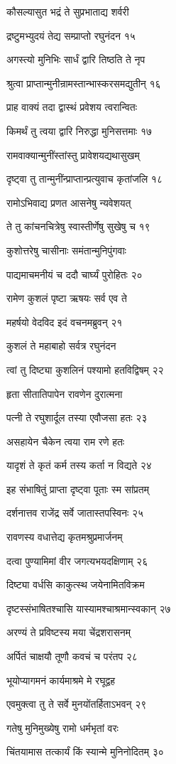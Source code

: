 कौसल्यासुत भद्रं ते सुप्रभाताद्य शर्वरी

द्रष्टुमभ्युदयं तेद्य सम्प्राप्तो रघुनंदन १५

अगस्त्यो मुनिभिः सार्धं द्वारि तिष्ठति ते नृप

श्रुत्वा प्राप्तान्मुनीन्रामस्तान्भास्करसमद्युतीन् १६

प्राह वाक्यं तदा द्वास्थं प्रवेशय त्वरान्वितः

किमर्थं तु त्वया द्वारि निरुद्धा मुनिसत्तमाः १७

रामवाक्यान्मुनींस्तांस्तु प्रावेशयद्यथासुखम्

दृष्ट्वा तु तान्मुनींन्प्राप्तान्प्रत्युवाच कृतांजलि १८

रामोऽभिवाद्य प्रणत आसनेषु न्यवेशयत्

ते तु कांचनचित्रेषु स्वास्तीर्णेषु सुखेषु च १९

कुशोत्तरेषु चासीनाः समंतान्मुनिपुंगवाः

पाद्यमाचमनीयं च ददौ चार्घ्यं पुरोहितः २०

रामेण कुशलं पृष्टा ऋषयः सर्व एव ते

महर्षयो वेदविद इदं वचनमब्रुवन् २१

कुशलं ते महाबाहो सर्वत्र रघुनंदन

त्वां तु दिष्ट्या कुशलिनं पश्यामो हतविद्विषम् २२

हृता सीतातिपापेन रावणेन दुरात्मना

पत्नी ते रघुशार्दूल तस्या एवौजसा हतः २३

असहायेन चैकेन त्वया राम रणे हतः

यादृशं ते कृतं कर्म तस्य कर्ता न विद्यते २४

इह संभाषितुं प्राप्ता दृष्ट्वा पूताः स्म सांप्रतम्

दर्शनात्तव राजेंद्र सर्वे जातास्तपस्विनः २५

रावणस्य वधात्तेद्य कृतमश्रुप्रमार्जनम्

दत्वा पुण्यामिमां वीर जगत्यभयदक्षिणाम् २६

दिष्ट्या वर्धसि काकुत्स्थ जयेनामितविक्रम

दृष्टस्संभाषितश्चासि यास्यामश्चाश्रमान्स्वकान् २७

अरण्यं ते प्रविष्टस्य मया चेंद्रशरासनम्

अर्पितं चाक्षयौ तूणौ कवचं च परंतप २८

भूयोप्यागमनं कार्यमाश्रमे मे रघूद्वह

एवमुक्त्वा तु ते सर्वे मुनयोंतर्हिताऽभवन् २९

गतेषु मुनिमुख्येषु रामो धर्मभृतां वरः

चिंतयामास तत्कार्यं किं स्यान्मे मुनिनोदितम् ३०

